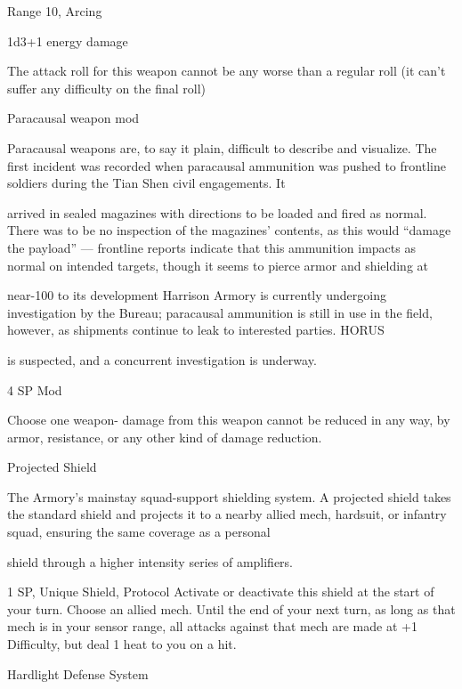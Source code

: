 Range 10, Arcing
 
1d3+1 energy damage
 
The attack roll for this weapon cannot be any worse than a regular roll (it can’t suffer any  
difficulty on the final roll)
 

Paracausal weapon mod  

Paracausal weapons are, to say it plain, difficult to describe and visualize. The first incident was recorded  
when paracausal ammunition was pushed to frontline soldiers during the Tian Shen civil engagements. It  

arrived in sealed magazines with directions to be loaded and fired as normal. There was to be no inspection  
of the magazines’ contents, as this would “damage the payload” — frontline reports indicate that this  
ammunition impacts as normal on intended targets, though it seems to pierce armor and shielding at  

                                                                                                                 


near-100%
to its development Harrison Armory is currently undergoing investigation by the Bureau; paracausal  
ammunition is still in use in the field, however, as shipments continue to leak to interested parties. HORUS  

is suspected, and a concurrent investigation is underway.    

4 SP  
Mod
 
Choose one weapon- damage from this weapon cannot be reduced in any way, by armor,  
resistance, or any other kind of damage reduction.
 

Projected Shield  

The Armory’s mainstay squad-support shielding system. A projected shield takes the standard shield and  
projects it to a nearby allied mech, hardsuit, or infantry squad, ensuring the same coverage as a personal  

shield through a higher intensity series of amplifiers.   

1 SP, Unique  
Shield, Protocol  
Activate or deactivate this shield at the start of your turn. Choose an allied mech. Until the end of  
your next turn, as long as that mech is in your sensor range, all attacks against that mech are  
made at +1 Difficulty, but deal 1 heat to you on a hit.
 

Hardlight Defense System  


